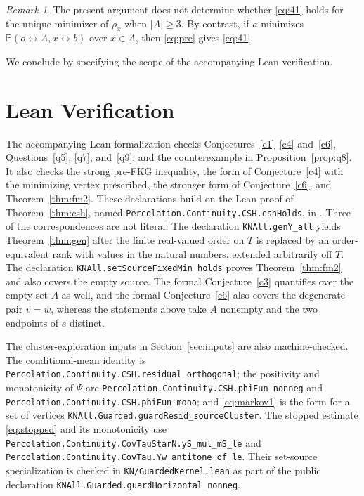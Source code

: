 \documentclass[11pt]{article}
\theoremstyle{definition}
\theoremstyle{remark}
\newtheorem{remark}[theorem]{Remark}
\newcommand{\PP}{\mathbb P}
\newcommand{\con}{\leftrightarrow}
\begin{document}
\begin{remark}
The present argument does not determine whether \eqref{eq:41} holds for the unique minimizer of $\rho_x$ when
$|A|\geq3$. By contrast, if $a$ minimizes $\PP(o\con A,x\con b)$ over $x\in A$, then
\eqref{eq:pre} gives \eqref{eq:41}.
\end{remark}

We conclude by specifying the scope of the accompanying Lean verification.

\section{Lean Verification}\label{sec:lean}

The accompanying Lean formalization checks Conjectures~\ref{c1}--\ref{c4} and~\ref{c6},
Questions~\ref{q5}, \ref{q7}, and~\ref{q9}, and the counterexample in
Proposition~\ref{prop:q8}. It also checks the strong pre-FKG inequality, the form of
Conjecture~\ref{c4} with the minimizing vertex prescribed, the stronger form of Conjecture~\ref{c6}, and
Theorem~\ref{thm:fm2}. These declarations build on the Lean proof of
Theorem~\ref{thm:csh}, named \texttt{Percolation.Continuity.CSH.cshHolds}, in \cite{Dev}.
Three of the correspondences are not literal. The declaration \texttt{KNAll.genY\_all}
yields Theorem~\ref{thm:gen} after the finite real-valued order on $T$ is replaced by an
order-equivalent rank with values in the natural numbers, extended arbitrarily off $T$. The
declaration \texttt{KNAll.setSourceFixedMin\_holds} proves Theorem~\ref{thm:fm2} and also
covers the empty source. The formal Conjecture~\ref{c3} quantifies over the empty set $A$ as
well, and the formal Conjecture~\ref{c6} also covers the degenerate pair $v=w$, whereas the
statements above take $A$ nonempty and the two endpoints of $e$ distinct.

The cluster-exploration inputs in Section~\ref{sec:inputs} are also machine-checked. The
conditional-mean identity is
\nolinkurl{Percolation.Continuity.CSH.residual_orthogonal}; the positivity and
monotonicity of $\Psi$ are \nolinkurl{Percolation.Continuity.CSH.phiFun_nonneg} and
\nolinkurl{Percolation.Continuity.CSH.phiFun_mono}; and \eqref{eq:markov1} is the form for a set of
vertices \nolinkurl{KNAll.Guarded.guardResid_sourceCluster}. The stopped estimate
\eqref{eq:stopped} and its monotonicity use
\nolinkurl{Percolation.Continuity.CovTauStarN.yS_mul_mS_le} and
\nolinkurl{Percolation.Continuity.CovTau.Yw_antitone_of_le}. Their set-source specialization is checked in
\nolinkurl{KN/GuardedKernel.lean} as part of the public declaration
\nolinkurl{KNAll.Guarded.guardHorizontal_nonneg}.
\end{document}
